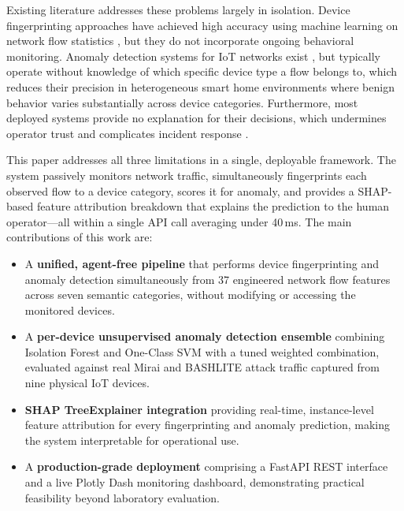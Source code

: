 \documentclass[conference]{IEEEtran}
\begin{document}
Existing literature addresses these problems largely in isolation. Device
fingerprinting approaches have achieved high accuracy using machine learning
on network flow statistics \cite{sivanathan2019classifying,miettinen2017iotsentinel,marchal2019audi},
but they do not incorporate ongoing behavioral monitoring. Anomaly detection
systems for IoT networks exist \cite{doshi2018machine,hasan2019attack,bezerra2019iotds},
but typically operate without knowledge of which specific device type a flow
belongs to, which reduces their precision in heterogeneous smart home
environments where benign behavior varies substantially across device
categories. Furthermore, most deployed systems provide no explanation for
their decisions, which undermines operator trust and complicates incident
response \cite{lundberg2017unified}.

This paper addresses all three limitations in a single, deployable
framework. The system passively monitors network traffic, simultaneously
fingerprints each observed flow to a device category, scores it for anomaly,
and provides a SHAP-based feature attribution breakdown that explains the
prediction to the human operator---all within a single API call averaging
under 40\,ms. The main contributions of this work are:

\begin{itemize}
    \item A \textbf{unified, agent-free pipeline} that performs device
    fingerprinting and anomaly detection simultaneously from 37 engineered
    network flow features across seven semantic categories, without modifying
    or accessing the monitored devices.

    \item A \textbf{per-device unsupervised anomaly detection ensemble}
    combining Isolation Forest and One-Class SVM with a tuned weighted
    combination, evaluated against real Mirai and BASHLITE attack traffic
    captured from nine physical IoT devices.

    \item \textbf{SHAP TreeExplainer integration} providing real-time,
    instance-level feature attribution for every fingerprinting and anomaly
    prediction, making the system interpretable for operational use.

    \item A \textbf{production-grade deployment} comprising a FastAPI REST
    interface and a live Plotly Dash monitoring dashboard, demonstrating
    practical feasibility beyond laboratory evaluation.
\end{itemize}
\end{document}
